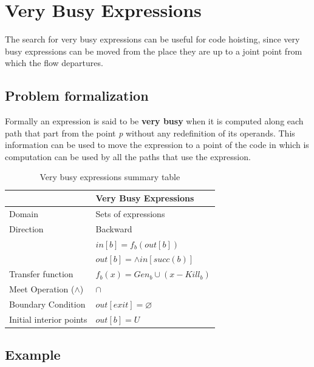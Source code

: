 \documentclass{article}
\begin{document}
\section{Very Busy Expressions}

The search for very busy expressions can be useful for code hoisting, since very busy expressions can be moved from the place they are up to a joint point from which the flow departures.

\subsection{Problem formalization}

Formally an expression is said to be \textbf{very busy} when it is computed along each path that part from the point \textit{p} without any redefinition of its operands. This information can be used to move the expression to a point of the code in which is computation can be used by all the paths that use the expression.

\begin{table}[H]
\centering
\begin{tabular}{|p{}|p{}|}
\hline
 & \textbf{Very Busy Expressions} \\
\hline
Domain & Sets of expressions \\
\hline
Direction & Backward \\
 & $in[b] = f_b(out[b])$ \\
 & $out[b] = \wedge in[succ(b)]$ \\
\hline
Transfer function & $f_b(x) = Gen_b \cup (x - Kill_b)$ \\
\hline
Meet Operation ($\wedge$) & $\cap$ \\
\hline
Boundary Condition & $out[exit] = \varnothing$ \\
\hline
Initial interior points & $out[b] = U$ \\
\hline
\end{tabular}
\caption{Very busy expressions summary table}
\label{tab:dataflow_problem_x}
\end{table}

\subsection{Example}
\end{document}
